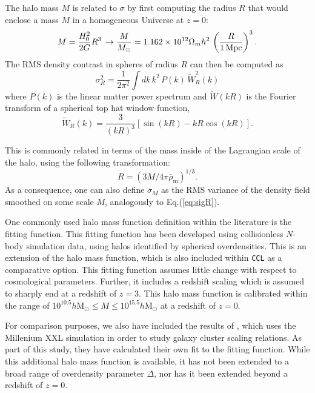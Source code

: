 \documentclass[\docopts]{\docclass}
\newcommand{\ccl}{{\tt CCL}\xspace}
\begin{document}
The halo mass $M$ is related to $\sigma$ by first computing the radius $R$ that would enclose a mass $M$ in a homogeneous Universe at $z=0$:
\begin{equation}
  M=\frac{H_0^2}{2G}R^3\,\rightarrow \frac{M}{M_\odot}=1.162\times10^{12}\Omega_mh^2\,\left(\frac{R}{1\,{\rm Mpc}}\right)^3.
\end{equation}
The RMS density contrast in spheres of radius $R$ can then be computed as
\begin{equation}
  \sigma_R^2 = \frac{1}{2\pi^2}\int dk\,k^2\,P(k)\,\tilde{W}_R^2(k)
  \label{eq:sigR}
\end{equation}
where $P(k)$ is the linear matter power spectrum and $\tilde{W}(kR)$ is the Fourier transform of a spherical top hat window function,
\begin{equation}
\tilde{W}_R(k) = \frac{3}{(kR)^3}[\sin(kR)-kR\cos(kR)].
\end{equation}

This is commonly related in terms of the mass inside of the Lagrangian scale of the halo, using the following transformation:
\begin{equation}
R = (3M/4\pi{\bar\rho_{\mathrm{m}}})^{1/3}.
\label{eq:lagrangemass}
\end{equation}
As a consequence, one can also define $\sigma_M$ as the RMS variance of the density field smoothed on some scale $M$, analogously to Eq.(\ref{eq:sigR}).

One commonly used halo mass function definition within the literature is the \citet{Tinker2010} fitting function. This fitting function has been developed using collisionless $N$-body simulation data, using halos identified by spherical overdensities. This is an extension of the \citet{Tinker2008} halo mass function, which is also included within \ccl as a comparative option. This fitting function assumes little change with respect to cosmological parameters. Further, it includes a redshift scaling which is assumed to sharply end at a redshift of $z = 3$. This halo mass function is calibrated within the range of $10^{10.5} h\mathrm{M}_\odot \leq M \leq 10^{15.5} h\mathrm{M}_\odot$ at a redshift of $z = 0$.

For comparison purposes, we also have included the results of \citet{Angulo2012}, which uses the Millenium XXL simulation in order to study galaxy cluster scaling relations. As part of this study, they have calculated their own fit to the \citet{Tinker2010} fitting function. While this additional halo mass function is available, it has not been extended to a broad range of overdensity parameter $\Delta$, nor has it been extended beyond a redshift of $z = 0$.
\end{document}
